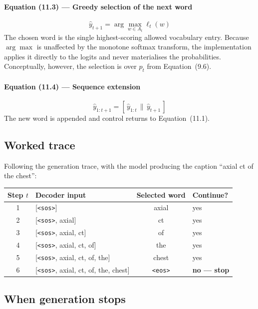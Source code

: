 \documentclass[12pt]{article}
\newcommand{\code}[1]{\texttt{#1}}
\begin{document}
\paragraph{Equation (11.3) --- Greedy selection of the next word}
\begin{equation}
\hat{y}_{t+1} = \arg\max_{w \in A_t} \ell_t(w)
\end{equation}
The chosen word is the single highest-scoring allowed vocabulary entry. Because $\arg\max$ is unaffected by the monotone softmax transform, the implementation applies it directly to the logits and never materialises the probabilities. Conceptually, however, the selection is over $p_t$ from Equation~(9.6).

\paragraph{Equation (11.4) --- Sequence extension}
\begin{equation}
\hat{y}_{1:t+1} = [\, \hat{y}_{1:t} \,\|\, \hat{y}_{t+1} \,]
\end{equation}
The new word is appended and control returns to Equation~(11.1).

\subsection{Worked trace}

Following the generation trace, with the model producing the caption ``axial ct of the chest'':

\begin{center}
\begin{tabular}{@{}cL{5.2cm}cl@{}}
\toprule
Step $t$ & Decoder input & Selected word & Continue? \\
 & [\code{<sos>}] & axial & yes \\
2 & [\code{<sos>}, axial] & ct & yes \\
3 & [\code{<sos>}, axial, ct] & of & yes \\
4 & [\code{<sos>}, axial, ct, of] & the & yes \\
5 & [\code{<sos>}, axial, ct, of, the] & chest & yes \\
6 & [\code{<sos>}, axial, ct, of, the, chest] & \code{<eos>} & \textbf{no --- stop} \\
\bottomrule
\end{tabular}
\end{center}

\subsection{When generation stops}
\label{sec:inference-stop}
\end{document}
